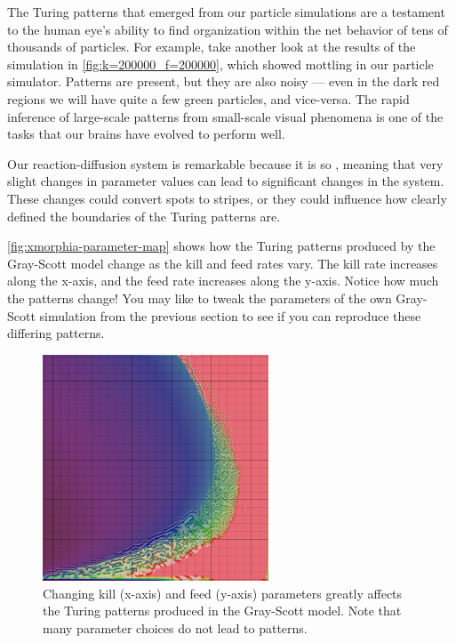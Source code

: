 The Turing patterns that emerged from our particle simulations are a testament to the human eye's ability to find organization within the net behavior of tens of thousands of particles. For example, take another look at the results of the simulation in \autoref{fig:k=200000_f=200000}, which showed mottling in our particle simulator. Patterns are present, but they are also noisy --- even in the dark red regions we will have quite a few green particles, and vice-versa. The rapid inference of large-scale patterns from small-scale visual phenomena is one of the tasks that our brains have evolved to perform well.

Our reaction-diffusion system is remarkable because it is so , meaning that very slight changes in parameter values can lead to significant changes in the system. These changes could convert spots to stripes, or they could influence how clearly defined the boundaries of the Turing patterns are.

\autoref{fig:xmorphia-parameter-map} shows how the Turing patterns produced by the Gray-Scott model change as the kill and feed rates vary. The kill rate increases along the x-axis, and the feed rate increases along the y-axis. Notice how much the patterns change! You may like to tweak the parameters of the own Gray-Scott simulation from the previous section to see if you can reproduce these differing patterns.\\

\begin{figure}[h]
\centering
\mySfFamily
\includegraphics[width = 0.6\textwidth]{../images/xmorphia-parameter-map.jpg}
\caption{Changing kill (x-axis) and feed (y-axis) parameters greatly affects the Turing patterns produced in the Gray-Scott model. Note that many parameter choices do not lead to patterns.}
\label{fig:xmorphia-parameter-map}
\end{figure}

